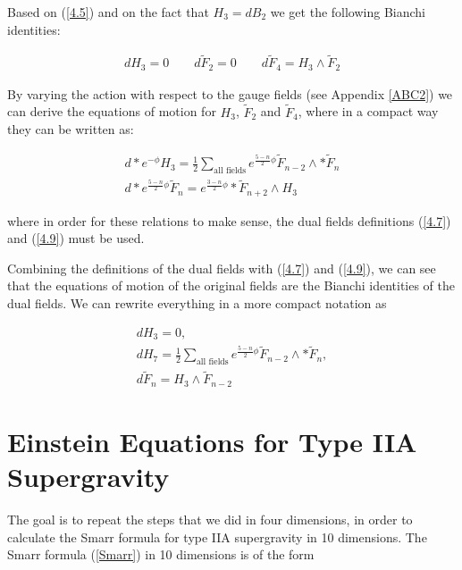 \documentclass[a4paper,notitlepage]{report}
\begin{document}
\vspace{0.5em}
Based on (\ref{4.5}) and on the fact that $H_{3} = dB_{2}$ we get the following Bianchi identities:

\begin{align} \label{4.10}
dH_{3} = 0 \qquad d\tilde{F}_{2} = 0 \qquad d\tilde{F}_{4} = H_{3} \wedge \tilde{F}_{2}
\end{align}

\vspace{0.5em}
By varying the action with respect to the gauge fields (see Appendix  \ref{ABC2}) we can derive the equations of motion for $H_3$, ${\tilde{F}_{2}}$ and ${\tilde{F}_{4}}$, where in a compact way they can be written as:

\begin{gather}
d*e^{-\phi} H_3 = \frac{1}{2} \sum_{\text{all fields}} e^{\frac{5-n}{2}\phi} {\tilde{F}_{n-2}} \wedge * {\tilde{F}_{n}} \label{4.11} \\
d*e^{\frac{5-n}{2}\phi}{\tilde{F}_{n}} = e^{\frac{3-n}{2}\phi} *{\tilde{F}_{n+2}} \wedge H_3 \label{4.12}
\end{gather}

\vspace{0.5em}
where in order for these relations to make sense, the dual fields definitions (\ref{4.7}) and (\ref{4.9}) must be used.

Combining the definitions of the dual fields with (\ref{4.7}) and (\ref{4.9}), we can see that the equations of motion of the original fields are the Bianchi identities of the dual fields. We can rewrite everything in a more compact notation as \cite{blaaback2010smeared}

\begin{gather}
dH_3 = 0, \label{4.13} \\
dH_7 = \frac{1}{2} \sum_{\text{all fields}} e^{\frac{5-n}{2}\phi} {\tilde{F}_{n-2}} \wedge * {\tilde{F}_{n}}, \label{4.14} \\
d\tilde{F}_{n} = H_3 \wedge \tilde{F}_{n-2} \label{4.15}
\end{gather}

\section{Einstein Equations for Type IIA Supergravity}

The goal is to repeat the steps that we did in four dimensions, in order to calculate the Smarr formula for type IIA supergravity in 10 dimensions. The Smarr formula (\ref{Smarr}) in 10 dimensions is of the form
\end{document}
